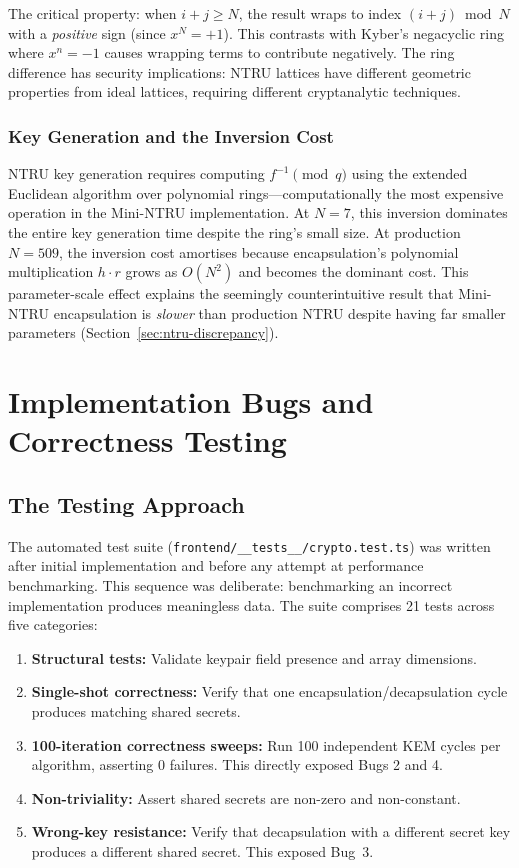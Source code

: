 \documentclass[12pt,a4paper]{report}
\begin{document}
The critical property: when $i + j \geq N$, the result wraps to index $(i+j) \bmod N$
with a \emph{positive} sign (since $x^N = +1$). This contrasts with Kyber's
negacyclic ring where $x^n = -1$ causes wrapping terms to contribute negatively.
The ring difference has security implications: NTRU lattices have different geometric
properties from ideal lattices, requiring different cryptanalytic techniques.

\subsection{Key Generation and the Inversion Cost}

NTRU key generation requires computing $f^{-1} \pmod{q}$ using the extended
Euclidean algorithm over polynomial rings---computationally the most expensive
operation in the Mini-NTRU implementation. At $N = 7$, this inversion dominates
the entire key generation time despite the ring's small size. At production $N = 509$,
the inversion cost amortises because encapsulation's polynomial multiplication
$h \cdot r$ grows as $O(N^2)$ and becomes the dominant cost. This parameter-scale
effect explains the seemingly counterintuitive result that Mini-NTRU encapsulation is
\emph{slower} than production NTRU despite having far smaller parameters
(Section~\ref{sec:ntru-discrepancy}).

\chapter{Implementation Bugs and Correctness Testing}
\label{sec:testing}

\section{The Testing Approach}

The automated test suite (\texttt{frontend/\_\_tests\_\_/crypto.test.ts}) was written
after initial implementation and before any attempt at performance benchmarking.
This sequence was deliberate: benchmarking an incorrect implementation produces
meaningless data. The suite comprises 21 tests across five categories:

\begin{enumerate}
  \item \textbf{Structural tests:} Validate keypair field presence and array dimensions.
  \item \textbf{Single-shot correctness:} Verify that one encapsulation/decapsulation
  cycle produces matching shared secrets.
  \item \textbf{100-iteration correctness sweeps:} Run 100 independent KEM cycles per
  algorithm, asserting 0 failures. This directly exposed Bugs 2 and 4.
  \item \textbf{Non-triviality:} Assert shared secrets are non-zero and non-constant.
  \item \textbf{Wrong-key resistance:} Verify that decapsulation with a different
  secret key produces a different shared secret. This exposed Bug~3.
\end{enumerate}
\end{document}
